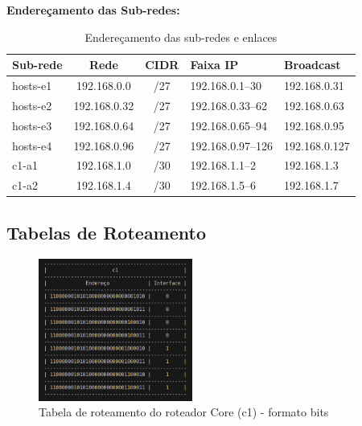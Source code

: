 \documentclass[conference,compsoc]{IEEEtran}
\begin{document}
\begin{otherlanguage}{brazil}
\textbf{Endereçamento das Sub-redes:}

\begin{table}[h]
\small
\begin{tabularx}{\linewidth}{|l|c|c|X|X|}
\hline
Sub-rede & Rede & CIDR & Faixa IP & Broadcast \\
\hline
hosts-e1 & 192.168.0.0 & /27 & 192.168.0.1--30 & 192.168.0.31 \\
\hline
hosts-e2 & 192.168.0.32 & /27 & 192.168.0.33--62 & 192.168.0.63 \\
\hline
hosts-e3 & 192.168.0.64 & /27 & 192.168.0.65--94 & 192.168.0.95 \\
\hline
hosts-e4 & 192.168.0.96 & /27 & 192.168.0.97--126 & 192.168.0.127 \\
\hline
c1-a1 & 192.168.1.0 & /30 & 192.168.1.1--2 & 192.168.1.3 \\
\hline
c1-a2 & 192.168.1.4 & /30 & 192.168.1.5--6 & 192.168.1.7 \\
\hline
\end{tabularx}
\caption{Endereçamento das sub-redes e enlaces}
\end{table}


\subsection{Tabelas de Roteamento}

\begin{figure}[h]
\centering
\includegraphics[width=0.45\textwidth]{../media/bits c1.png}
\caption{Tabela de roteamento do roteador Core (c1) - formato bits}
\end{figure}


\end{otherlanguage}
\end{document}

